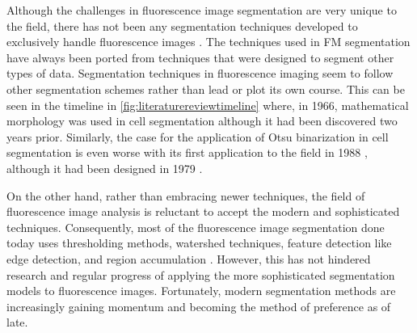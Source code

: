 \begin{definition}
	Although the challenges in fluorescence image segmentation are very unique to the field, there has not been any segmentation techniques developed to exclusively handle fluorescence images \cite{Meijering2012}. The techniques used in FM segmentation have always been ported from techniques that were designed to segment other types of data. Segmentation techniques in fluorescence imaging seem to follow other segmentation schemes rather than lead or plot its own course.
	This can be seen in the timeline in \autoref{fig:literaturereviewtimeline} where, in 1966, mathematical morphology was used in cell segmentation although it had been discovered two years prior. Similarly, the case for the application of Otsu binarization in cell segmentation is even worse with its first application to the field in 1988 \citep{Geerts1988}, although it had been designed in 1979 \cite{Otsu1979}.
	
	On the other hand, rather than embracing newer techniques, the field of fluorescence image analysis is reluctant to accept the modern and sophisticated techniques. Consequently, most of the fluorescence image segmentation done today uses thresholding methods, watershed techniques, feature detection like edge detection, and region accumulation \cite{Meijering2012}. However, this has not hindered research and regular progress of applying the more sophisticated segmentation models to fluorescence images. Fortunately, modern segmentation methods are increasingly gaining momentum and becoming the method of preference as of late.
\end{definition}



